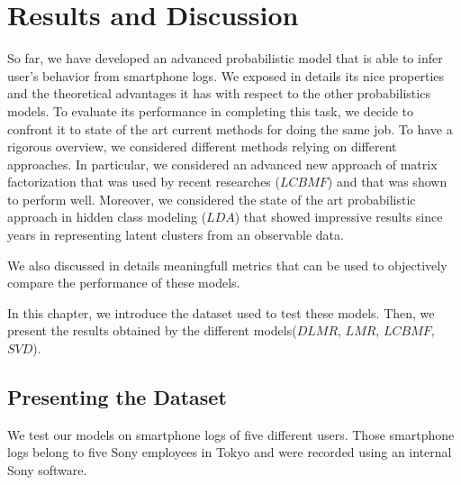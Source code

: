 
\chapter{Results and Discussion} %

\label{Chapter6} %


So far, we have developed an advanced probabilistic model that is able to infer user's behavior from smartphone logs. We exposed in details its nice properties and the theoretical advantages it has with respect to the other probabilistics models. To evaluate its performance in completing this task, we decide to confront it to state of the art current methods for doing the same job. To have a rigorous overview, we considered different methods relying on different approaches. In particular, we considered an advanced new approach of matrix factorization that was used by recent researches ($LCBMF$) and that was shown to perform well. Moreover, we considered the state of the art probabilistic approach in hidden class modeling ($LDA$) that showed impressive results since years in representing latent clusters from an observable data.

\noindent
We also discussed in details meaningfull metrics that can be used to objectively compare the performance of these models.

In this chapter, we introduce the dataset used to test these models. Then, we present the results obtained by the different models($DLMR$, $LMR$, $LCBMF$, $SVD$).


\section{Presenting the Dataset}

We test our models on smartphone logs of five different users. Those smartphone logs belong to five Sony employees in Tokyo and were recorded using an internal Sony software.

